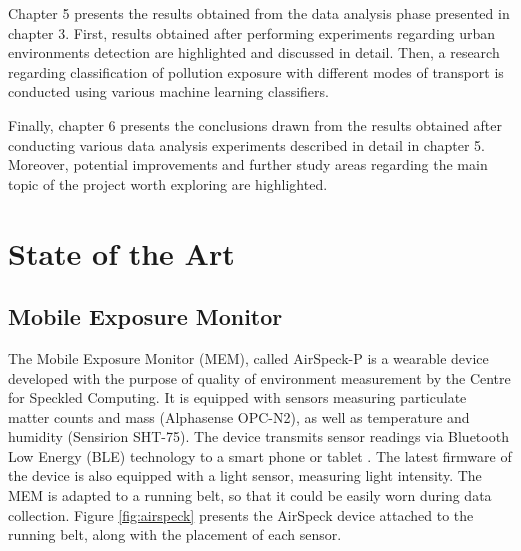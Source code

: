 \documentclass[bsc,frontabs,twoside,singlespacing, parskip,deptreport]{infthesis}     %
\begin{document}
Chapter 5 presents the results obtained from the data analysis phase presented in chapter 3. First, results obtained after performing experiments regarding urban environments detection are highlighted and discussed in detail. Then, a research regarding classification of pollution exposure with different modes of transport is conducted using various machine learning classifiers.

Finally, chapter 6 presents the conclusions drawn from the results obtained after conducting various data analysis experiments described in detail in chapter 5. Moreover, potential improvements and further study areas regarding the main topic of the project worth exploring are highlighted.

\chapter{State of the Art}

\section{Mobile Exposure Monitor}

The Mobile Exposure Monitor (MEM), called AirSpeck-P is a wearable device developed with the purpose of quality of environment measurement by the Centre for Speckled Computing. It is equipped with sensors measuring particulate matter counts and mass (Alphasense OPC-N2), as well as temperature and humidity (Sensirion SHT-75). The device transmits sensor readings via Bluetooth Low Energy (BLE) technology to a smart phone or tablet \cite{airspeck}. The latest firmware of the device is also equipped with a light sensor, measuring light intensity. The MEM is adapted to a running belt, so that it could be easily worn during data collection. Figure \ref{fig:airspeck} presents the AirSpeck device attached to the running belt, along with the placement of each sensor.
\end{document}
